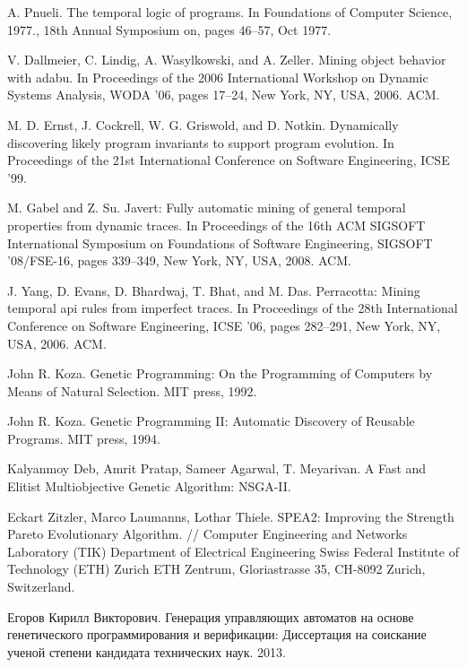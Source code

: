 \documentclass[12pt,fleqn]{article}
\begin{document}
\begin{thebibliography}{10}

A. Pnueli. The temporal logic of programs. In Foundations of Computer Science, 1977., 18th Annual Symposium on, pages 46–57, Oct 1977.

V. Dallmeier, C. Lindig, A. Wasylkowski, and A. Zeller. Mining object behavior with adabu. In Proceedings of the
2006 International Workshop on Dynamic Systems Analysis, WODA ’06, pages 17–24, New York, NY, USA, 2006. ACM.

M. D. Ernst, J. Cockrell, W. G. Griswold, and D. Notkin. Dynamically discovering likely program invariants to support program evolution. In
Proceedings of the 21st International Conference on Software Engineering, ICSE ’99.

M. Gabel and Z. Su. Javert: Fully automatic mining of general temporal properties from dynamic traces. In Proceedings of the 
16th ACM SIGSOFT International Symposium on Foundations of Software Engineering, SIGSOFT ’08/FSE-16, pages 339–349, New York, NY, USA, 2008. ACM.

J. Yang, D. Evans, D. Bhardwaj, T. Bhat, and M. Das. Perracotta: Mining temporal api rules from imperfect traces. In Proceedings of the 28th
International Conference on Software Engineering, ICSE ’06, pages 282–291, New York, NY, USA, 2006. ACM.

John R. Koza. Genetic Programming: On the Programming of Computers by Means of Natural Selection. MIT press, 1992.

John R. Koza. Genetic Programming II: Automatic Discovery of Reusable Programs. MIT press, 1994.

Kalyanmoy Deb, Amrit Pratap, Sameer Agarwal, T. Meyarivan. A Fast and Elitist Multiobjective Genetic Algorithm: NSGA-II.

Eckart Zitzler, Marco Laumanns, Lothar Thiele. SPEA2: Improving the Strength Pareto Evolutionary Algorithm. //
Computer Engineering and Networks Laboratory (TIK)
Department of Electrical Engineering
Swiss Federal Institute of Technology (ETH) Zurich
ETH Zentrum, Gloriastrasse 35, CH-8092 Zurich, Switzerland.

Егоров Кирилл Викторович. Генерация управляющих автоматов на основе генетического программирования и верификации: 
Диссертация на соискание ученой степени кандидата технических наук. 2013.   

\end{thebibliography}
\end{document}
